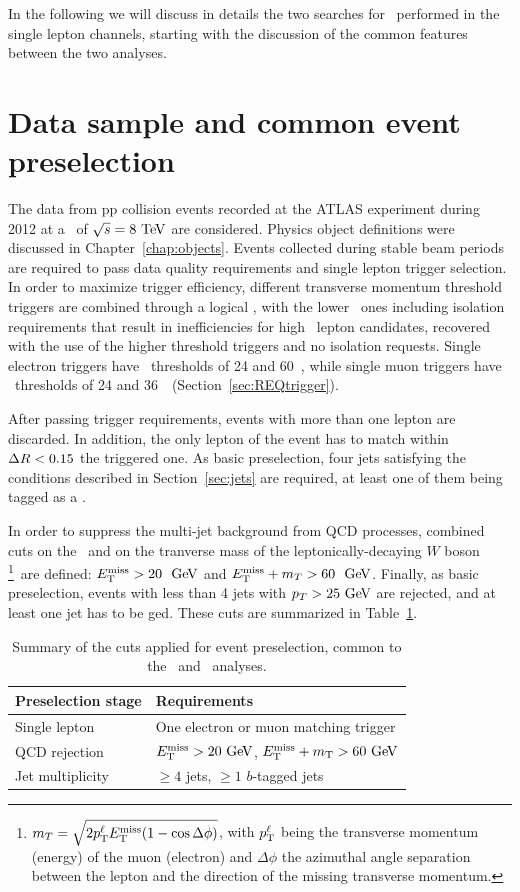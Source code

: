 In the following we will discuss in details the two searches for 
\TT\ performed in the single lepton channels, starting with the
discussion of the common features between the two analyses.


\section{Data sample and common event preselection}\label{sec:presel}

The data from pp collision events recorded at the ATLAS experiment during
2012 at a \cme\ of $\rts=8\tev$ are considered. Physics object definitions 
were discussed in Chapter~\ref{chap:objects}.
Events collected during
stable beam periods are required to pass data quality requirements and
single lepton trigger selection. In order to maximize trigger
efficiency, different transverse momentum threshold triggers are combined
through a logical \OR, with the lower \pt\ ones including isolation requirements
that result in inefficiencies for high \pt\ lepton candidates, recovered with
the use of the higher threshold triggers and 
no isolation requests. Single electron triggers have
\pt\ thresholds of 24 and 60~\gev, while
single muon triggers have \pt\ thresholds  
of 24 and 36~\gev\ (Section~\ref{sec:REQtrigger}).

After passing trigger requirements, events with more than one lepton are
discarded. In addition, the only lepton of the event has to match within $\dr<0.15$ the
triggered one. As basic preselection, four jets satisfying the conditions
described in Section~\ref{sec:jets} are required, at least one of them
being tagged as a \bjet.

In order to suppress the multi-jet background from QCD processes,
combined cuts on the \met\ and on the tranverse mass of the 
leptonically-decaying $W$ boson \mt\footnote{$\mt = \sqrt{2 p^\ell_{\rm T} \met (1-\cos\Delta\phi)}$, with
$p^\ell_{\rm T}$  being the transverse momentum (energy) of the 
muon (electron) and $\Delta\phi$ the
azimuthal angle separation between the lepton and the direction of
the missing transverse momentum.}\ 
are defined: $\met>20~\gev$ and $\met+\mt>60~\gev$.
Finally, as basic preselection, events with less than 4 jets with
$p_T>25\gev$ are rejected, and at least one jet
has to be \btag ged. These cuts are summarized in
Table~\ref{tab:preselcuts}.

\begin{table}[tb]
\begin{center}
\begin{tabular}{ll}
\toprule
Preselection stage & Requirements \\
\midrule
Single lepton & One electron or muon matching trigger  \\
QCD rejection & $\met >20\gev$, $\met +m_{\rm T}>60\gev$ \\
Jet multiplicity & $\geq 4$ jets, $\geq 1$ $b$-tagged jets \\
\bottomrule\end{tabular}\caption{Summary of the cuts applied for 
event preselection, common to the \wbx\ and \htx\ analyses.}\label{tab:preselcuts}
\end{center}
\end{table}


